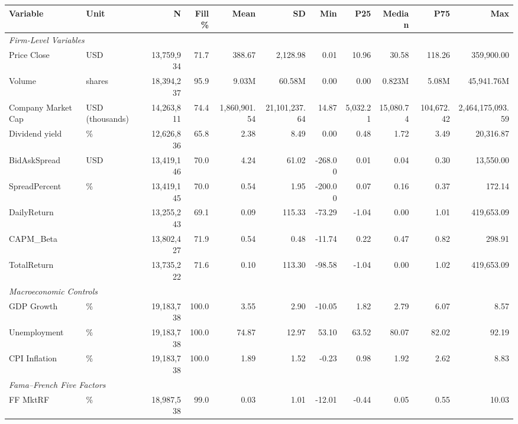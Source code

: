 \documentclass{article}
\theoremstyle{plain}
\begin{document}
\begin{table}
\centering
\footnotesize
\setlength{\tabcolsep}{3.5pt}
\begin{tabular}{l l r r r r r r r r r}
\toprule
\textbf{Variable} & \textbf{Unit} & \textbf{N} & \textbf{Fill\%} & \textbf{Mean} & \textbf{SD} & \textbf{Min} & \textbf{P25} & \textbf{Median} & \textbf{P75} & \textbf{Max} \\
\midrule
\multicolumn{11}{l}{\textit{Firm-Level Variables}} \\
  Price Close & USD & 13,759,934 & 71.7 & 388.67 & 2,128.98 & 0.01 & 10.96 & 30.58 & 118.26 & 359,900.00 \\
  Volume & shares & 18,394,237 & 95.9 & 9.03M & 60.58M & 0.00 & 0.00 & 0.823M & 5.08M & 45,941.76M \\
  Company Market Cap & USD (thousands) & 14,263,811 & 74.4 & 1,860,901.54 & 21,101,237.64 & 14.87 & 5,032.21 & 15,080.74 & 104,672.42 & 2,464,175,093.59 \\
  Dividend yield & \% & 12,626,836 & 65.8 & 2.38 & 8.49 & 0.00 & 0.48 & 1.72 & 3.49 & 20,316.87 \\
  BidAskSpread & USD & 13,419,146 & 70.0 & 4.24 & 61.02 & -268.00 & 0.01 & 0.04 & 0.30 & 13,550.00 \\
  SpreadPercent & \% & 13,419,145 & 70.0 & 0.54 & 1.95 & -200.00 & 0.07 & 0.16 & 0.37 & 172.14 \\
  DailyReturn &  & 13,255,243 & 69.1 & 0.09 & 115.33 & -73.29 & -1.04 & 0.00 & 1.01 & 419,653.09 \\
  CAPM\_Beta &  & 13,802,427 & 71.9 & 0.54 & 0.48 & -11.74 & 0.22 & 0.47 & 0.82 & 298.91 \\
  TotalReturn &  & 13,735,222 & 71.6 & 0.10 & 113.30 & -98.58 & -1.04 & 0.00 & 1.02 & 419,653.09 \\
\midrule
\multicolumn{11}{l}{\textit{Macroeconomic Controls}} \\
  GDP Growth & \% & 19,183,738 & 100.0 & 3.55 & 2.90 & -10.05 & 1.82 & 2.79 & 6.07 & 8.57 \\
  Unemployment & \% & 19,183,738 & 100.0 & 74.87 & 12.97 & 53.10 & 63.52 & 80.07 & 82.02 & 92.19 \\
  CPI Inflation & \% & 19,183,738 & 100.0 & 1.89 & 1.52 & -0.23 & 0.98 & 1.92 & 2.62 & 8.83 \\
\midrule
\multicolumn{11}{l}{\textit{Fama--French Five Factors}} \\
  FF MktRF & \% & 18,987,538 & 99.0 & 0.03 & 1.01 & -12.01 & -0.44 & 0.05 & 0.55 & 10.03 \\

\end{tabular}
\end{table}
\end{document}
